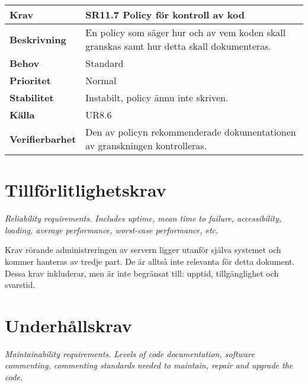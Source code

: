 \documentclass[a4paper, twoside, 11pt, titlepage]{article}
\begin{document}
\begin{tabular} { p{2.6cm} p{12.5cm} }
	\hline
	\sffamily\textbf{Krav} & \sffamily\textbf{SR11.7 Policy för kontroll av kod  } \\
	\hline
	\sffamily\textbf{Beskrivning} &  En policy som säger hur och av vem koden skall granskas samt hur detta skall dokumenteras.   \\
	\hline
	\sffamily\textbf{Behov} &  Standard   \\
	\hline
	\sffamily\textbf{Prioritet} &  Normal   \\
	\hline
	\sffamily\textbf{Stabilitet} &  Instabilt, policy ännu inte skriven.   \\
	\hline
	\sffamily\textbf{Källa} &  UR8.6   \\
	\hline
	\sffamily\textbf{Verifierbarhet} &  Den av policyn rekommenderade dokumentationen av granskningen kontrolleras.   \\
	\hline
\end{tabular}


\clearpage
\section{Tillförlitlighetskrav}


\emph{Reliability requirements. Includes uptime, mean time to failure, accessibility, loading, average performance, worst-case performance, etc.}

Krav rörande administreringen av servern ligger utanför själva systemet och kommer hanteras av tredje part. De är alltså inte relevanta för detta dokument. Dessa krav inkluderar, men är inte begränsat till: upptid, tillgänglighet och svarstid.

\clearpage
\section{Underhållskrav}


\emph{Maintainability requirements. Levels of code documentation, software commenting, commenting standards needed to maintain, repair and upgrade the code.}
\end{document}
